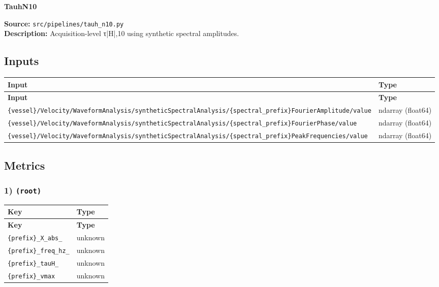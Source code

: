 \documentclass[11pt]{article}
\begin{document}
\begin{center}
\LARGE\textbf{TauhN10}
\end{center}
\textbf{Source:} \texttt{src/\allowbreak{}pipelines/\allowbreak{}tauh\_\allowbreak{}n10.py}\\
\textbf{Description:} Acquisition-level τ|H|,10 using synthetic spectral amplitudes.

\subsection*{Inputs}
\begin{longtable}{|p{}|p{}|}
\hline
\textbf{Input} & \textbf{Type} \\ \hline
\endfirsthead
\hline
\textbf{Input} & \textbf{Type} \\ \hline
\endhead
{\scriptsize \texttt{\{vessel\}/\allowbreak{}Velocity/\allowbreak{}WaveformAnalysis/\allowbreak{}syntheticSpectralAnalysis/\allowbreak{}\{spectral\_\allowbreak{}prefix\}FourierAmplitude/\allowbreak{}value}} & ndarray (float64) \\ \hline
{\scriptsize \texttt{\{vessel\}/\allowbreak{}Velocity/\allowbreak{}WaveformAnalysis/\allowbreak{}syntheticSpectralAnalysis/\allowbreak{}\{spectral\_\allowbreak{}prefix\}FourierPhase/\allowbreak{}value}} & ndarray (float64) \\ \hline
{\scriptsize \texttt{\{vessel\}/\allowbreak{}Velocity/\allowbreak{}WaveformAnalysis/\allowbreak{}syntheticSpectralAnalysis/\allowbreak{}\{spectral\_\allowbreak{}prefix\}PeakFrequencies/\allowbreak{}value}} & ndarray (float64) \\ \hline
\end{longtable}

\subsection*{Metrics}
\subsubsection*{1) \texttt{(root)}}
\begin{longtable}{|p{}|p{}|}
\hline
\textbf{Key} & \textbf{Type} \\ \hline
\endfirsthead
\hline
\textbf{Key} & \textbf{Type} \\ \hline
\endhead
\texttt{\{prefix\}\_\allowbreak{}X\_\allowbreak{}abs\_\allowbreak{}} & unknown \\ \hline
\texttt{\{prefix\}\_\allowbreak{}freq\_\allowbreak{}hz\_\allowbreak{}} & unknown \\ \hline
\texttt{\{prefix\}\_\allowbreak{}tauH\_\allowbreak{}} & unknown \\ \hline
\texttt{\{prefix\}\_\allowbreak{}vmax} & unknown \\ \hline
\end{longtable}
\end{document}
